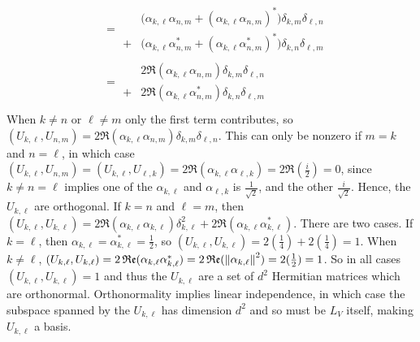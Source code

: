 \begin{align*}
&= \begin{array}{cc}&\bigl(\alpha_{k,\ell}\alpha_{n,m}+(\alpha_{k,\ell}\alpha_{n,m})^*\bigr)\delta_{k,m}\delta_{\ell,n} \\ +& \bigl(\alpha_{k,\ell}\alpha_{n,m}^* + (\alpha_{k,\ell}\alpha_{n,m}^*)^*\bigr)\delta_{k,n}\delta_{\ell,m}
\end{array} \tag{group like $\delta$s, property of $^*$} \\
&= \begin{array}{cc}&2\Re(\alpha_{k,\ell}\alpha_{n,m})\delta_{k,m}\delta_{\ell,n} \\+& 2\Re(\alpha_{k,\ell}\alpha_{n,m}^*)\delta_{k,n}\delta_{\ell,m} \end{array} \tag{property of $^*$} \\
\end{align*}
\endgroup
\noindent When $k\neq n$ or $\ell \neq m$ only the first term contributes, so $(U_{k,\ell}, U_{n, m}) = 2\Re(\alpha_{k,\ell}\alpha_{n,m})\delta_{k,m}\delta_{\ell,n}$.  This can only be nonzero if $m=k$ and $n=\ell$, in which case  $(U_{k,\ell}, U_{n, m}) = (U_{k,\ell}, U_{\ell, k}) =  2\Re(\alpha_{k,\ell}\alpha_{\ell,k}) = 2\Re(\frac{i}{2}) = 0$, since $k\neq n = \ell$ implies one of the $\alpha_{k,\ell}$ and $\alpha_{\ell,k}$ is $\frac{1}{\sqrt{2}}$, and the other 
$\frac{i}{\sqrt{2}}$.  Hence, the $U_{k,\ell}$ are orthogonal.  If $k=n$ and $\ell=m$, then $(U_{k,\ell}, U_{k,\ell}) = 2\Re(\alpha_{k,\ell}\alpha_{k,\ell})\delta_{k,\ell}^2 + 2\Re(\alpha_{k,\ell}\alpha_{k,\ell}^*)$.  There are two cases.  If $k=\ell$, then $\alpha_{k,\ell} = \alpha_{k,\ell}^* =\frac{1}{2}$, so $(U_{k,\ell}, U_{k,\ell}) = 2(\frac{1}{4})+2(\frac{1}{4}) = 1$.  When $k\neq\ell$, $(U_{k,\ell}, U_{k,\ell}) = 2\operatorname{\mathfrak{Re}}(\alpha_{k,\ell}\alpha_{k,\ell}^*) = 2\operatorname{\mathfrak{Re}}(\left\lVert\alpha_{k,\ell}\right\rVert^2) = 2(\frac{1}{2}) = 1$.  So in all cases $(U_{k,\ell}, U_{k,\ell}) = 1$ and thus the $U_{k,\ell}$ are a set of $d^2$ Hermitian matrices which are orthonormal.  Orthonormality implies linear independence, in which case the subspace spanned by the $U_{k,\ell}$ has dimension $d^2$ and so must be $L_V$ itself, making $U_{k,\ell}$ a basis.


